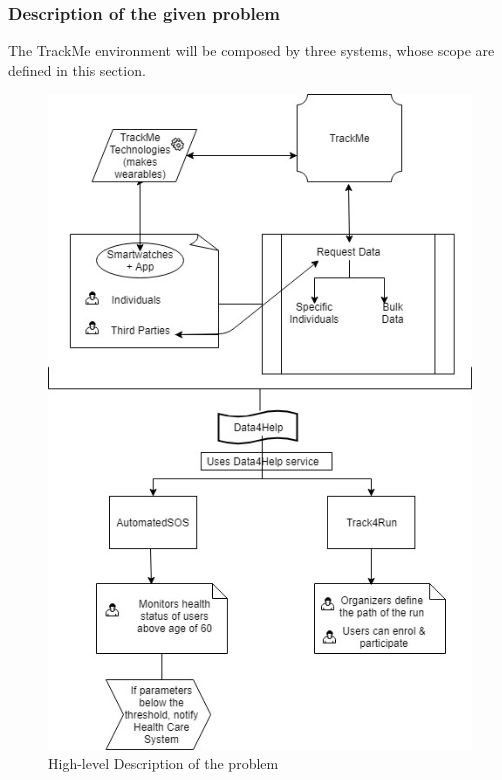 \documentclass[12pt]{article}
\begin{document}
\subsubsection{Description of the given problem}
The TrackMe environment will be composed by three systems, whose scope are defined in this section. \\

\begin{figure}[H]
\centering
\includegraphics[scale=0.45]{Diagrams/high_level.jpg}
\caption[High-level Description of the problem]{High-level Description of the problem}
\label{fig:High_level}
\end{figure}
\end{document}
